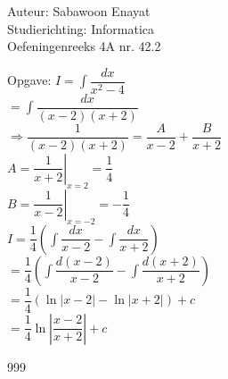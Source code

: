 \documentclass[a4paper]{article}
\begin{document}
  
\noindent \large Auteur: Sabawoon Enayat \\
\noindent \large Studierichting: Informatica\\
\noindent \large Oefeningenreeks 4A nr. 42.2 \\

\newcommand{\dint}{\displaystyle\int}

\medskip

\normalsize

Opgave: $I = \dint \dfrac{dx}{x^2 - 4}$\\

$= \dint \dfrac{dx}{(x - 2)(x + 2)}$\\

$\Rightarrow \dfrac{1}{(x - 2)(x + 2)} = \dfrac{A}{x - 2} + \dfrac{B}{x + 2}$\\

$A = \left. \dfrac{1}{x + 2} \right|_{x=2} = \dfrac{1}{4}$\\

$B = \left. \dfrac{1}{x - 2} \right|_{x=-2} = -\dfrac{1}{4}$\\

$I = \dfrac{1}{4}\left(\dint \dfrac{dx}{x - 2} - \dint \dfrac{dx}{x + 2}\right)$\\

$= \dfrac{1}{4}\left(\dint \dfrac{d(x - 2)}{x - 2} - \dint \dfrac{d(x + 2)}{x + 2}\right)$\\

$= \dfrac{1}{4}\left(\ln |x - 2| - \ln |x + 2|\right) + c$\\

$= \dfrac{1}{4} \ln \left|\dfrac{x - 2}{x + 2}\right| + c$\\

\begin{thebibliography}{999}
\end{thebibliography}
\end{document}
